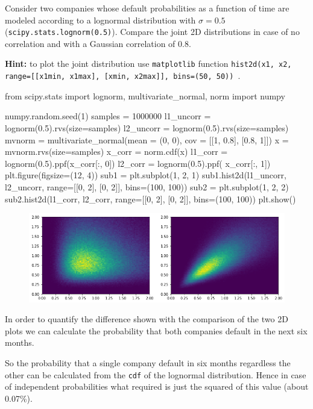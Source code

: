 \begin{question}
Consider two companies whose default probabilities as a function of time are modeled according to a lognormal distribution with $\sigma =0.5$ (\texttt{scipy.stats.lognorm(0.5)}). Compare the joint 2D distributions in case of no correlation and with a Gaussian correlation of 0.8.

\noindent\textbf{Hint:} to plot the joint distribution use \texttt{matplotlib} function \texttt{hist2d(x1, x2, range=[[x1min, x1max], [xmin, x2max]], bins=(50, 50)) }.
\end{question}

\begin{solution}
\end{solution}

\begin{ipython}
from scipy.stats import lognorm, multivariate_normal, norm
import numpy

numpy.random.seed(1)
samples = 1000000
l1_uncorr = lognorm(0.5).rvs(size=samples)
l2_uncorr = lognorm(0.5).rvs(size=samples)
mvnorm = multivariate_normal(mean = (0, 0), 
                             cov = [[1, 0.8],
                                    [0.8, 1]])
x = mvnorm.rvs(size=samples)
x_corr = norm.cdf(x)
l1_corr = lognorm(0.5).ppf(x_corr[:, 0])
l2_corr = lognorm(0.5).ppf(
x_corr[:, 1])
plt.figure(figsize=(12, 4))
sub1 = plt.subplot(1, 2, 1)
sub1.hist2d(l1_uncorr, l2_uncorr, range=[[0, 2], [0, 2]], bins=(100, 100))
sub2 = plt.subplot(1, 2, 2)
sub2.hist2d(l1_corr, l2_corr, range=[[0, 2], [0, 2]], bins=(100, 100))
plt.show()
\end{ipython}

\begin{figure}[htbp]
\begin{center}
	\includegraphics[width=0.7\linewidth]{figures/copula_lognormal.png}
\end{center}
\end{figure}

In order to quantify the difference shown with the comparison of the two 2D plots we can calculate the probability that both companies default in the next six months.

So the probability that a single company default in six months regardless the other can be calculated from the \texttt{cdf} of the lognormal distribution.
Hence in case of independent probabilities what required is just the squared of this value (about 0.07\%).


